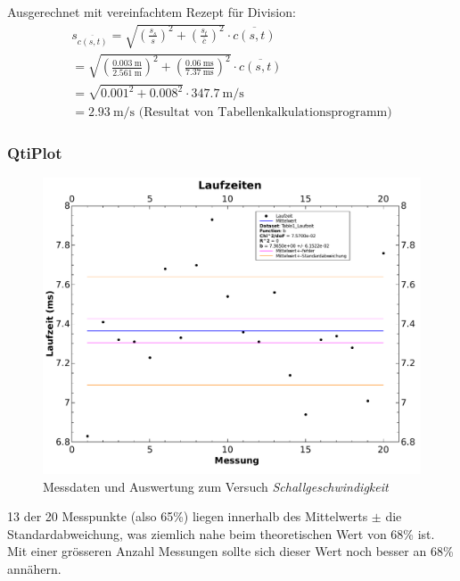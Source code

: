 Ausgerechnet mit vereinfachtem Rezept f\"ur Division:
\begin{gather*}
    s_{\overline{c(s,t)}} = \sqrt{ \left( \frac{s_{s}}{s} \right)^2 + \left( \frac{s_{t}}{\overline{c}} \right)^2} \cdot \overline{c(s,t)} \\
    = \sqrt{ \left( \frac{\SI{0.003}{\meter}}{\SI{2.561}{\meter}} \right)^2 + \left( \frac{\SI{0.06}{\milli\second}}{\SI{7.37}{\milli\second}} \right)^2 } \cdot \overline{c(s,t)} \\
    = \sqrt{ 0.001^2 + 0.008^2} \cdot \SI{347.7}{\meter\per\second} \\
    = \SI{2.93}{\meter\per\second} \text{ (Resultat von Tabellenkalkulationsprogramm)}
\end{gather*}


\clearpage
\subsubsection{QtiPlot}
\begin{figure}[th!]
    \centering
    \includegraphics[width=\textwidth]{images/aufgabe1.pdf}
    \caption{Messdaten und Auswertung zum Versuch \emph{Schallgeschwindigkeit}}
    \label{fig:schallgeschwindigkeit}
\end{figure}

13 der  20 Messpunkte (also 65\%)  liegen innerhalb des Mittelwerts  $\pm$ die
Standardabweichung,  was  ziemlich  nahe  beim  theoretischen  Wert  von  68\%
ist. Mit  einer gr\"osseren  Anzahl  Messungen sollte  sich  dieser Wert  noch
besser an 68\% ann\"ahern.


